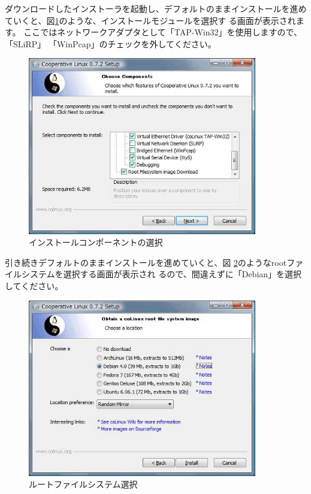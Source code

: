 \documentclass[mingoth,a4paper]{jsarticle}
\begin{document}
ダウンロードしたインストーラを起動し、デフォルトのままインストールを進め
ていくと、図\ref{fig:components}のような、インストールモジュールを選択す
る画面が表示されます。
ここではネットワークアダプタとして「TAP-Win32」を使用しますので、「SLiRP」
「WinPcap」のチェックを外してください。

\begin{figure}[htbp]
 \begin{center}
  \includegraphics[width=100mm]{image200804/colinux_components.png}
 \end{center}
 \caption{インストールコンポーネントの選択}
 \label{fig:components}
\end{figure}

引き続きデフォルトのままインストールを進めていくと、図
\ref{fig:rootimage}のようなrootファイルシステムを選択する画面が表示され
るので、間違えずに「Debian」を選択してください。

\begin{figure}[htbp]
 \begin{center}
  \includegraphics[width=100mm]{image200804/colinux_rootimage.png}
 \end{center}
 \caption{ルートファイルシステム選択}
 \label{fig:rootimage}
\end{figure}
\end{document}
